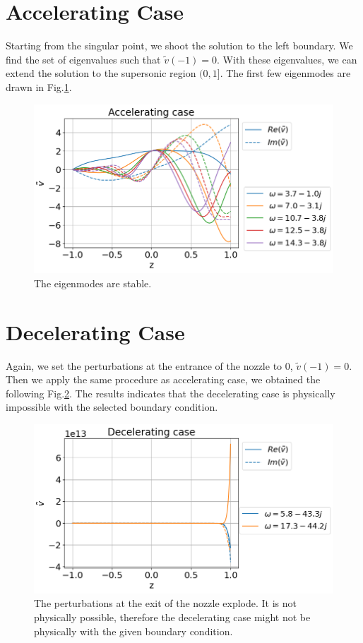 \section{Accelerating Case}
Starting from the singular point, we shoot the solution to the left boundary. We find the set of eigenvalues such that $\tilde{v}(-1)=0$. With these eigenvalues, we can extend the solution to the supersonic region $(0,1]$. The first few eigenmodes are drawn in Fig.\ref{fig:results-accelerating-v}.
\begin{figure} [H]
	\centering
	\includegraphics[width=0.7\linewidth]{figures/results-accelerating-v}
	\caption{The eigenmodes are stable.}
	\label{fig:results-accelerating-v}
\end{figure}

\section{Decelerating Case}
Again, we set the perturbations at the entrance of the nozzle to 0, $\tilde{v}(-1)=0$. Then we apply the same procedure as accelerating case, we obtained the following Fig.\ref{fig:results-decelerating-v}. The results indicates that the decelerating case is physically impossible with the selected boundary condition.
\begin{figure} [H]
	\centering
	\includegraphics[width=0.7\linewidth]{figures/results-decelerating-v}
	\caption{The perturbations at the exit of the nozzle explode. It is not physically possible, therefore the decelerating case might not be physically with the given boundary condition.}
	\label{fig:results-decelerating-v}
\end{figure}
